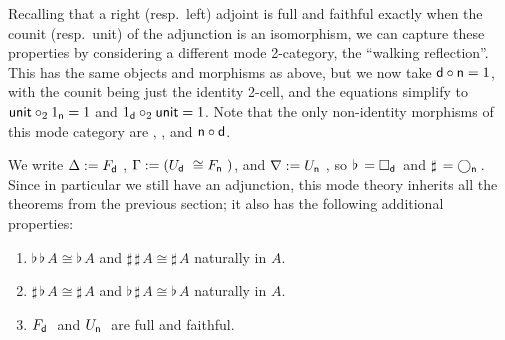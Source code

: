 \documentclass{drl-common/llncs}
\newcommand\compo[2]{\ensuremath{#1 \circ #2}}
\newcommand\comph[2]{\ensuremath{#1 \mathbin{\circ_2} #2}}
\newcommand\F[2]{\ensuremath{F_{#1} \,\, #2}}
\newcommand\U[2]{\ensuremath{U_{#1} \,\, #2}}
\newcommand\Bx[2]{\ensuremath{\Box_{#1} \, {#2}}}
\newcommand\Crc[2]{\ensuremath{\bigcirc_{#1} \, {#2}}}
\newcommand\Flat[1]{\ensuremath{\flat \, {#1}}}
\newcommand\Sharp[1]{\ensuremath{\sharp \, {#1}}}
\newcommand\iso{\cong}
\begin{document}
Recalling that a right (resp.\ left) adjoint is full and faithful
exactly when the counit (resp.\ unit) of the adjunction is an isomorphism,
we can capture these properties by considering a different mode
2-category, the ``walking reflection''. This has the same objects and
morphisms as above, but we now take $\compo{\dsd d}{\dsd n} = 1$, with
the counit being just the identity 2-cell, and the equations simplify to
$\comph{\dsd{unit}}{1_{\dsd n}} = 1$ and $\comph{1_{\dsd d}}{\dsd{unit}}
= 1$.  Note that the only non-identity morphisms of this mode category
are , , and \compo{\dsd{n}}{\dsd{d}}.  

We write $\Delta := \F{\dsd{d}}{}$, $\Gamma := (\U{\dsd d}{} \iso
\F{\dsd n}{})$, and $\nabla := \U{\dsd{n}}{}$, so $\Flat{} =
\Bx{\dsd{d}}{}$ and $\Sharp{} = \Crc{\dsd{n}}{}$.  Since in particular
we still have an adjunction, this mode theory inherits all the theorems
from the previous section; it also has the following additional
properties:

\begin{theorem}
\begin{enumerate}
\item $\Flat{\Flat A} \iso \Flat A$ and $\Sharp{\Sharp A} \iso \Sharp A$
  naturally in $A$.
\item $\Sharp{\Flat A} \iso \Sharp{A}$ 
and $\Flat{\Sharp A} \iso \Flat{A}$ naturally in $A$.
\item \F{\dsd{d}}{} and \U{\dsd{n}}{} are full and faithful.
\end{enumerate}
\end{theorem}
\end{document}

